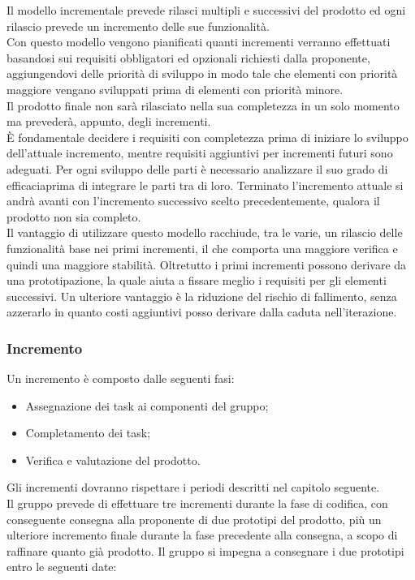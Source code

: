 Il modello incrementale prevede rilasci multipli e successivi del prodotto ed ogni rilascio prevede un incremento delle sue funzionalità. \\
Con questo modello vengono pianificati quanti incrementi verranno effettuati basandosi sui requisiti obbligatori ed opzionali richiesti dalla proponente, aggiungendovi delle priorità di sviluppo in modo tale che elementi con priorità maggiore vengano sviluppati prima di elementi con priorità minore.\\
Il prodotto finale non sarà rilasciato nella sua completezza in un solo momento ma prevederà, appunto, degli incrementi. \\
È fondamentale decidere i requisiti con completezza prima di iniziare lo sviluppo dell'attuale incremento, mentre requisiti aggiuntivi per incrementi futuri sono adeguati. Per ogni sviluppo delle parti è necessario analizzare il suo grado di efficacia\glossario prima di integrare le parti tra di loro. Terminato l'incremento attuale si andrà avanti con l'incremento successivo scelto precedentemente, qualora il prodotto non sia completo. \\
Il vantaggio di utilizzare questo modello racchiude, tra le varie, un rilascio delle funzionalità base nei primi incrementi, il che comporta una maggiore verifica e quindi una maggiore stabilità. Oltretutto i primi incrementi possono derivare da una prototipazione, la quale aiuta a fissare meglio i requisiti per gli elementi successivi. Un ulteriore vantaggio è la riduzione del rischio di fallimento, senza azzerarlo in quanto costi aggiuntivi posso derivare dalla caduta nell'iterazione\glossario.

\subsubsection{Incremento}\label{inc}
Un incremento è composto dalle seguenti fasi:
\begin{itemize}
	\item Assegnazione dei task ai componenti del gruppo;
	\item Completamento dei task;
	\item Verifica e valutazione del prodotto.
\end{itemize}
Gli incrementi dovranno rispettare i periodi descritti nel capitolo seguente.\\
Il gruppo prevede di effettuare tre incrementi durante la fase di codifica, con conseguente consegna alla proponente di due prototipi del prodotto, più un ulteriore incremento finale durante la fase precedente alla consegna, a scopo di raffinare quanto già prodotto.
Il gruppo si impegna a consegnare i due prototipi entro le seguenti date:

